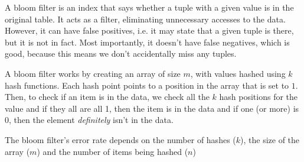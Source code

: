 A bloom filter is an index that says whether a tuple with a given value is  in the original table.
It acts as a filter, eliminating unnecessary accesses to the data.
However, it can have false positives, i.e. it may state that a given tuple is there, but it is not in fact.
Most importantly, it doesn't have false negatives, which is good, because this means we don't accidentally miss any tuples.

A bloom filter works by creating an array of size $m$, with values hashed using $k$ hash functions.
Each hash point points to a position in the array that is set to $1$.
Then, to check if an item is in the data, we check all the $k$ hash positions for the value
and if they all are all 1, then the item is in the data and if one (or more) is $0$, then the element \textit{definitely}
isn't in the data.

The bloom filter's error rate depends on the number of hashes ($k$), the size of the array ($m$) and the number of items being hashed ($n$)
